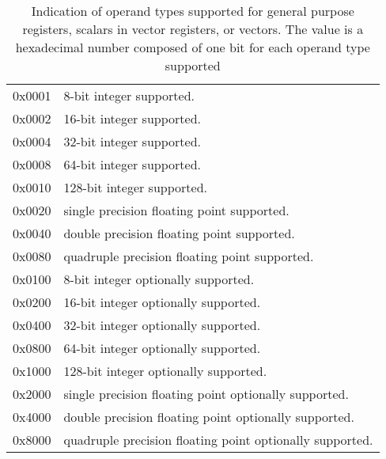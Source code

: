 \documentclass[forwardcom.tex]{subfiles}
\begin{document}
\begin{longtable} {|p{18mm}|p{100mm}|}
\caption{
Indication of operand types supported for general purpose registers, scalars in vector
registers, or vectors. The value is a hexadecimal number composed of one bit for each operand
type supported} 
\label{table:OperandTypesInInstructionList} \\
\endfirsthead
\endhead
\hline
0x0001 & 8-bit integer supported. \\
0x0002 & 16-bit integer supported. \\
0x0004 & 32-bit integer supported. \\
0x0008 & 64-bit integer supported. \\
0x0010 & 128-bit integer supported. \\
0x0020 & single precision floating point supported. \\
0x0040 & double precision floating point supported. \\
0x0080 & quadruple precision floating point supported. \\
0x0100 & 8-bit integer optionally supported. \\
0x0200 & 16-bit integer optionally supported. \\
0x0400 & 32-bit integer optionally supported. \\
0x0800 & 64-bit integer optionally supported. \\
0x1000 & 128-bit integer optionally supported. \\
0x2000 & single precision floating point optionally supported. \\
0x4000 & double precision floating point optionally supported. \\
0x8000 & quadruple precision floating point optionally supported. \\
\hline
\end{longtable}
\end{document}
